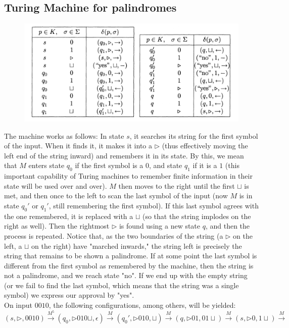 \documentclass[12pt]{article}
\newcommand{\tr}{\triangleright}
\begin{document}
\subsection{Turing Machine for palindromes}
\begin{figure}[ht]
\centering
\includegraphics[width=1\textwidth]{img/TM_palindrom.png}
\end{figure}
The machine works as follows: In state $s$, it searches its string for the first symbol of the input. When it finds it, it makes it into a $\tr$ (thus effectively moving the left end of the string inward) and remembers it in its state. By this, we mean that $M$ enters state $q_0$ if the first symbol is a $0$, and state $q_1$ if it is a $1$ (this important capability of Turing machines to remember finite information in their state will be used over and over). $M$ then moves to the right until the first $\sqcup$ is met, and then once to the left to scan the last symbol of the input (now $M$ is in state $q_0'$ or $q_1'$, still remembering the first symbol). If this last symbol agrees with the one remembered, it is replaced with a $\sqcup$ (so that the string implodes on the right as well). Then the rightmost $\tr$ is found using a new state $q$, and then the process is repeated. Notice that, as the two boundaries of the string (a $\tr$ on the left, a $\sqcup$ on the right) have "marched inwards," the string left is precisely the string that remains to be shown a palindrome. If at some point the last symbol is different from the first symbol as remembered by the machine, then the string is not a palindrome, and we reach state "no". If we end up with the empty string (or we fail to find the last symbol, which means that the string was a single symbol) we express our approval by "yes".
\\
On input $0010$, the following configurations, among others, will be yielded:
$$
(s, \tr, 0010) \xrightarrow{M^5} (q_0, \tr 010 \sqcup, \epsilon) \xrightarrow{M} (q_0', \tr 010, \sqcup) \xrightarrow{M} (q, \tr 01, 01 \sqcup) \xrightarrow{M} (s, \tr 0, 1 \sqcup) \xrightarrow{M}$$
\end{document}
